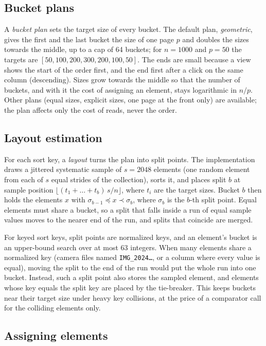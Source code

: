 \documentclass[11pt]{article}
\theoremstyle{definition}
\begin{document}
\subsection{Bucket plans}

A \emph{bucket plan} sets the target size of every bucket. The default plan,
\emph{geometric}, gives the first and the last bucket the size of one page
$p$ and doubles the sizes towards the middle, up to a cap of 64 buckets; for
$n=1000$ and $p=50$ the targets are
$[50, 100, 200, 300, 200, 100, 50]$. The ends are small because a view shows
the start of the order first, and the end first after a click on the same
column (descending). Sizes grow towards the middle so that the number of
buckets, and with it the cost of assigning an element, stays logarithmic in
$n/p$. Other plans (equal sizes, explicit sizes, one page at the front only)
are available; the plan affects only the cost of reads, never the order.

\subsection{Layout estimation}

For each sort key, a \emph{layout} turns the plan into split points. The
implementation draws a jittered systematic sample of $s=2048$ elements (one
random element from each of $s$ equal strides of the collection), sorts it, and
places split $b$ at sample position $\lfloor (t_1 + \dots + t_b)\, s / n
\rfloor$, where $t_i$ are the target sizes. Bucket $b$ then holds the elements
$x$ with $\sigma_{b-1} \preceq x \prec \sigma_b$, where $\sigma_b$ is the
$b$-th split point. Equal elements must share a bucket, so a split that falls
inside a run of equal sample values moves to the nearer end of the run, and
splits that coincide are merged.

For keyed sort keys, split points are normalized keys, and an element's
bucket is an upper-bound search over at most 63 integers. When many elements
share a normalized key (camera files named \texttt{IMG\_2024\ldots}, or a column
where every value is equal), moving the split to the end of the run would put
the whole run into one bucket. Instead, such a split point also stores the
sampled element, and elements whose key equals the split key are placed by
the tie-breaker. This keeps buckets near their target size under heavy key
collisions, at the price of a comparator call for the colliding elements only.

\subsection{Assigning elements}
\end{document}
